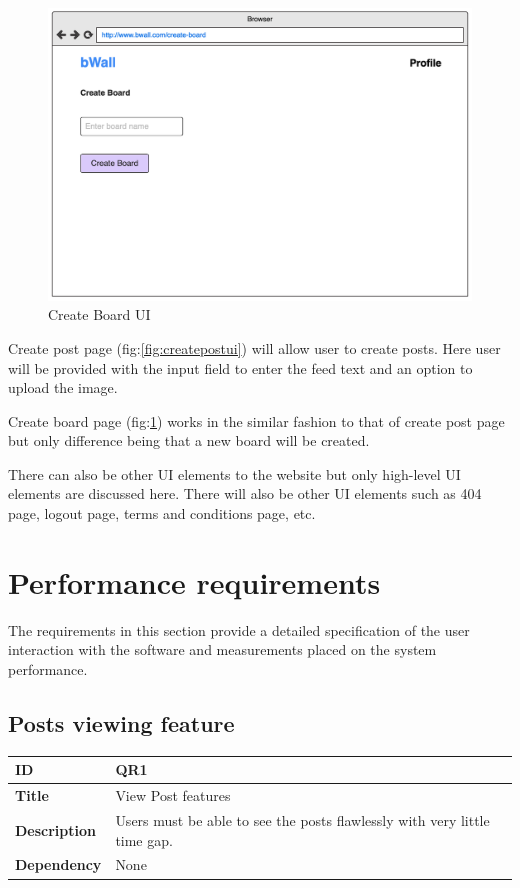 \documentclass[12pt]{report}
\begin{document}
\begin{figure}[H]
\centering
\includegraphics[width=12cm]{uicreateboard.png}
\caption{Create Board UI}
\label{fig:createboardui}
\end{figure}

Create post page (fig:\ref{fig:createpostui}) will allow user to create posts. Here user will be provided with the input field to enter the feed text and an option to upload the image.

Create board page (fig:\ref{fig:createboardui}) works in the similar fashion to that of create post page but only difference being that a new board will be created.

There can also be other UI elements to the website but only high-level UI elements are discussed here. There will also be other UI elements such as 404 page, logout page, terms and conditions page, etc.

\section{Performance requirements}
The requirements in this section provide a detailed specification of the user interaction with the software and measurements placed on the system performance.

\subsection{Posts viewing feature}

\begin{tabularx}{\textwidth} { 
  | >{\raggedright\arraybackslash}X 
  | >{\raggedright\arraybackslash}X |}
 \hline
 \textbf{ID} & QR1 \\
 \hline
 \textbf{Title}  & View Post features  \\
 \hline
 \textbf{Description} & Users must be able to see the posts flawlessly with very little time gap. \\
 \hline 
 \textbf{Dependency} & None \\
 \hline 
\end{tabularx}
\end{document}
